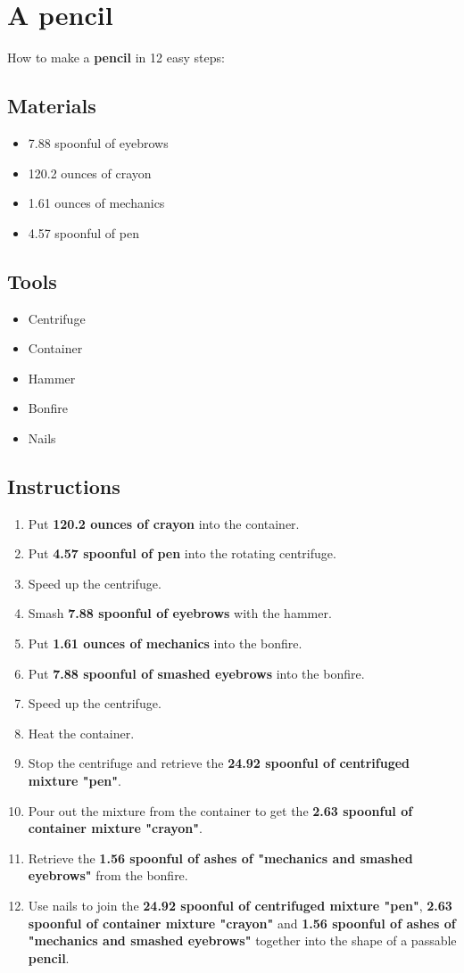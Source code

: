 \documentclass{article}
\begin{document}
\section{A pencil}How to make a \textbf{pencil} in 12 easy steps:

\subsection{Materials}\begin{itemize}
\item 
7.88 spoonful of eyebrows
\item 
120.2 ounces of crayon
\item 
1.61 ounces of mechanics
\item 
4.57 spoonful of pen
\end{itemize}
\subsection{Tools}\begin{itemize}
\item 
Centrifuge
\item 
Container
\item 
Hammer
\item 
Bonfire
\item 
Nails
\end{itemize}
\subsection{Instructions}\begin{enumerate}
\item 
Put \textbf{120.2 ounces of crayon} into the container.
\item 
Put \textbf{4.57 spoonful of pen} into the rotating centrifuge.
\item 
Speed up the centrifuge.
\item 
Smash \textbf{7.88 spoonful of eyebrows} with the hammer.
\item 
Put \textbf{1.61 ounces of mechanics} into the bonfire.
\item 
Put \textbf{7.88 spoonful of smashed eyebrows} into the bonfire.
\item 
Speed up the centrifuge.
\item 
Heat the container.
\item 
Stop the centrifuge and retrieve the \textbf{24.92 spoonful of centrifuged mixture "pen"}.
\item 
Pour out the mixture from the container to get the \textbf{2.63 spoonful of container mixture "crayon"}.
\item 
Retrieve the \textbf{1.56 spoonful of ashes of "mechanics and smashed eyebrows"} from the bonfire.
\item 
Use nails to join the \textbf{24.92 spoonful of centrifuged mixture "pen"}, \textbf{2.63 spoonful of container mixture "crayon"} and \textbf{1.56 spoonful of ashes of "mechanics and smashed eyebrows"} together into the shape of a passable \textbf{pencil}.
\end{enumerate}
\newpage
\end{document}
